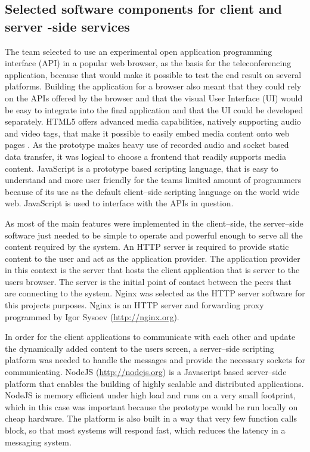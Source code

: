\documentclass[english,12pt,a4paper,pdftex]{article}
\begin{document}
\subsection{Selected software components for client and server -side services}

The team selected to use an experimental open application programming interface (API) in a popular web browser, as the basis for the teleconferencing application, because that would make it possible to test the end result on several platforms. Building the application for a browser also meant that they could rely on the APIs offered by the browser and that the visual User Interface (UI) would be easy to integrate into the final application and that the UI could be developed separately. HTML5 offers advanced media capabilities, natively supporting audio and video tags, that make it possible to easily embed media content onto web pages \cite{Meyn}. As the prototype makes heavy use of recorded audio and socket based data transfer, it was logical to choose a frontend that readily supports media content. JavaScript is a prototype based scripting language, that is easy to understand and more user friendly for the teams limited amount of programmers because of its use as the default client--side scripting language on the world wide web. JavaScript is used to interface with the APIs in question.

As most of the main features were implemented in the client--side, the server--side software just needed to be simple to operate and powerful enough to serve all the content required by the system. An HTTP server is required to provide static content to the user and act as the application provider. The application provider in this context is the server that hosts the client application that is server to the users browser. The server is the initial point of contact between the peers that are connecting to the system. Nginx was selected as the HTTP server software for this projects purposes. Nginx is an HTTP server and forwarding proxy programmed by Igor Sysoev (\url{http://nginx.org}).

In order for the client applications to communicate with each other and update the dynamically added content to the users screen, a server--side scripting platform was needed to handle the messages and provide the necessary sockets for communicating. NodeJS (\url{http://nodejs.org}) is a Javascript based server--side platform that enables the building of highly scalable and distributed applications. NodeJS is memory efficient under high load and runs on a very small footprint, which in this case was important because the prototype would be run locally on cheap hardware. The platform is also built in a way that very few function calls block, so that most systems will respond fast, which reduces the latency in a messaging system.
\end{document}

